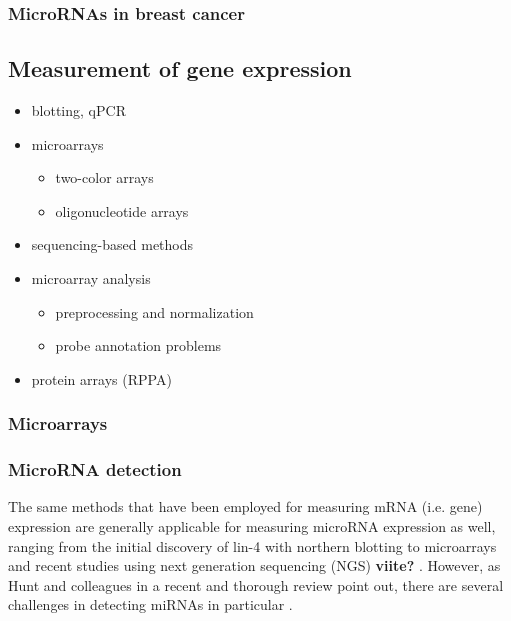 \subsubsection{MicroRNAs in breast cancer}








\subsection{Measurement of gene expression}\label{measurement-of-gene-expression}

\begin{itemize}
  \item blotting, qPCR
  \item microarrays
  \begin{itemize}
    \item two-color arrays
    \item oligonucleotide arrays
  \end{itemize}
  \item sequencing-based methods
  \item microarray analysis
  \begin{itemize}
    \item preprocessing and normalization
    \item probe annotation problems
  \end{itemize}
  \item protein arrays (RPPA)
\end{itemize}


\subsubsection{Microarrays}


\subsubsection{MicroRNA detection}

The same methods that have been employed for measuring mRNA (i.e. gene)
expression are generally applicable for measuring microRNA expression as well,
ranging from the initial discovery of lin-4 with northern blotting
\citep{Lee1993} to microarrays \citep{Liu2008} and recent studies using 
next generation sequencing (NGS)
\textbf{viite?} \citep{esimerkki}. However, as Hunt and colleagues in
a recent and thorough review point out, there are several
challenges in detecting miRNAs in particular \citep{Hunt2015}.

